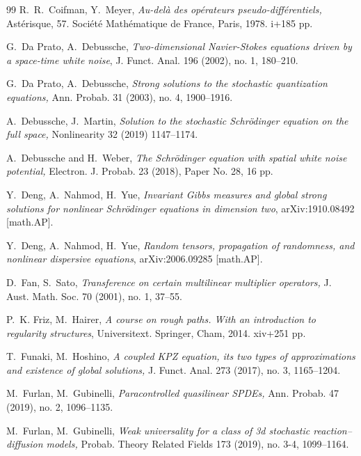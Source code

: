 \documentclass[%
11pt,  reqno]{amsart}
\newcommand{\1}{\hspace{0.2mm}\text{I}\hspace{0.2mm}}
\numberwithin{equation}{section}
\numberwithin{theorem}{section}
\begin{document}
\begin{thebibliography}{99}
R.~R.~Coifman,  Y.~Meyer,
{\it Au-del\`a des op\'erateurs pseudo-diff\'erentiels,} Ast\'erisque, 
 57. Soci\'et\'e Math\'ematique de France, Paris, 1978. i+185 pp. 
 



G.~Da Prato, A.~Debussche, 
{\it Two-dimensional Navier-Stokes equations driven by a space-time white noise}, 
J. Funct. Anal. 196 (2002), no. 1, 180--210.

G.~Da Prato, A.~Debussche, 
{\it Strong solutions to the stochastic quantization equations,} Ann. Probab. 31 (2003), no. 4, 1900--1916.


A.~Debussche,  J.~Martin,
{\it Solution to the stochastic {S}chr\"odinger equation on
  the full space,}
Nonlinearity
32 (2019) 1147--1174.

A.~Debussche and H.~Weber,
{\it The {Schr\"odinger} equation with spatial white noise potential,}
 Electron. J. Probab. 23 (2018), Paper No. 28, 16 pp.



Y.~Deng, A.~Nahmod, H.~Yue,
{\it Invariant Gibbs measures and global strong solutions for nonlinear Schr\"odinger equations in dimension two}, 
arXiv:1910.08492 [math.AP].


Y.~Deng, A.~Nahmod, H.~Yue,
{\it Random tensors, propagation of randomness, and nonlinear dispersive equations}, 
arXiv:2006.09285 [math.AP].

D.~Fan, S.~Sato, {\it Transference on certain multilinear multiplier operators,}
 J. Aust. Math. Soc. 70 (2001), no. 1, 37--55.

P.~K. Friz,  M.~Hairer,
{\it A course on rough paths.
With an introduction to regularity structures}, Universitext. Springer, Cham, 2014. xiv+251 pp.

T.~Funaki,  M.~Hoshino, {\it
A coupled KPZ equation, its two types of approximations and existence of global solutions,}
 J. Funct. Anal. 273 (2017), no. 3, 1165--1204. 


M.~Furlan,  M.~Gubinelli,
{\it Paracontrolled quasilinear {SPDEs},}
 Ann. Probab. 47 (2019), no. 2, 1096--1135. 


M.~Furlan,  M.~Gubinelli,
{\it Weak universality for a class of 3d stochastic reaction--diffusion
  models,}
 Probab. Theory Related Fields 173 (2019), no. 3-4, 1099--1164.





\end{thebibliography}
\end{document}
